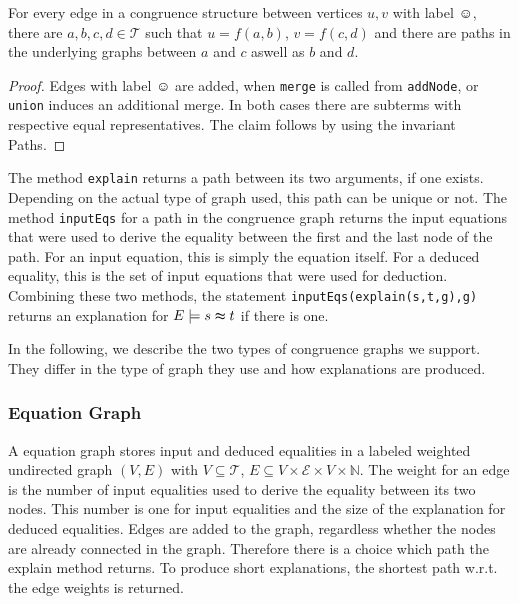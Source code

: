 \begin{invariant}

For every edge in a congruence structure between vertices $u,v$ with label $\smiley$, 
there are $a,b,c,d \in \mathcal{T}$ such that $u = f(a,b)$, $v = f(c,d)$ and
there are paths in the underlying graphs between $a$ and $c$ aswell as $b$ and $d$.

\end{invariant}

\begin{proof}

Edges with label $\smiley$ are added, when \texttt{merge} is called from \texttt{addNode}, or \texttt{union} induces an additional merge.
In both cases there are subterms with respective equal representatives.
The claim follows by using the invariant Paths.

\end{proof}

The method \texttt{explain} returns a path between its two arguments, if one exists.
Depending on the actual type of graph used, this path can be unique or not.
The method \texttt{inputEqs} for a path in the congruence graph returns the input equations that were used to derive the equality between the first and the last node of the path.
For an input equation, this is simply the equation itself.
For a deduced equality, this is the set of input equations that were used for deduction.
Combining these two methods, the statement \texttt{inputEqs(explain(s,t,g),g)} returns an explanation for $E \models s \thickapprox t$ if there is one.



In the following, we describe the two types of congruence graphs we support.
They differ in the type of graph they use and how explanations are produced.

\subsubsection*{Equation Graph}

A equation graph stores input and deduced equalities in a labeled weighted undirected graph $(V,E)$ with 
$V \subseteq \mathcal{T}$, $E \subseteq V \times \mathcal{E} \times V \times \mathbb{N}$.
The weight for an edge is the number of input equalities used to derive the equality between its two nodes.
This number is one for input equalities and the size of the explanation for deduced equalities.
Edges are added to the graph, regardless whether the nodes are already connected in the graph.
Therefore there is a choice which path the explain method returns.
To produce short explanations, the shortest path w.r.t. the edge weights is returned.

